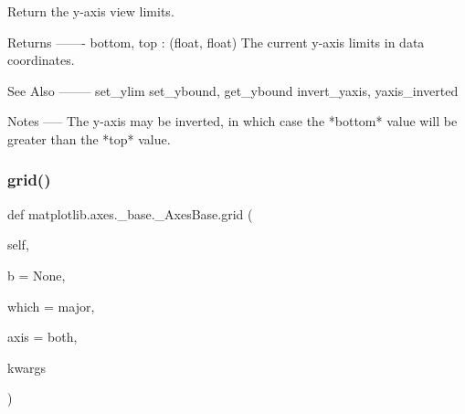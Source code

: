 \begin{DoxyVerb}Return the y-axis view limits.

Returns
-------
bottom, top : (float, float)
    The current y-axis limits in data coordinates.

See Also
--------
set_ylim
set_ybound, get_ybound
invert_yaxis, yaxis_inverted

Notes
-----
The y-axis may be inverted, in which case the *bottom* value
will be greater than the *top* value.\end{DoxyVerb}
 \mbox{\label{classmatplotlib_1_1axes_1_1__base_1_1__AxesBase_aadaa6527c7642ea25841d7f7a12bc899}} 
\subsubsection{\texorpdfstring{grid()}{grid()}}
{\footnotesize\ttfamily def matplotlib.\+axes.\+\_\+base.\+\_\+\+Axes\+Base.\+grid (\begin{DoxyParamCaption}\item[{}]{self,  }\item[{}]{b = {\ttfamily None},  }\item[{}]{which = {\ttfamily \textquotesingle{}major\textquotesingle{}},  }\item[{}]{axis = {\ttfamily \textquotesingle{}both\textquotesingle{}},  }\item[{}]{kwargs }\end{DoxyParamCaption})}

